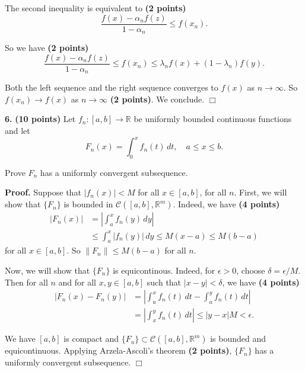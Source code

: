 \documentclass{article}
\begin{document}
The second inequality is equivalent to \textbf{(2 points)} \[
\frac{f(x) - \alpha_n f(z)}{1-\alpha_n} \le f(x_n).
\]

So we have \textbf{(2 points)} \[
\frac{f(x) - \alpha_n f(z)}{1-\alpha_n} \le f(x_n) \le \lambda_n f(x) + (1-\lambda_n)f(y).
\]

Both the left sequence and the right sequence converges to $f(x)$ as
$n \to\infty$. So $f(x_n) \to f(x)$ as $n\to \infty$ \textbf{(2
points)}. We conclude. $\Box$

    \textbf{6.} \textbf{(10 points)} Let $f_n:[a,b]\to \mathbb{R}$ be
uniformly bounded continuous functions and let
\[F_n(x) = \int_0^x f_n(t)\,dt,\quad a\le x \le b.\]

Prove $F_n$ has a uniformly convergent subsequence.

\textbf{Proof.} Suppose that $|f_n(x)| < M$ for all $x\in [a,b]$, for
all $n$. First, we will show that $\{F_n\}$ is bounded in
$\mathcal{C}([a,b],\mathbb{R}^m)$. Indeed, we have \textbf{(4 points)}
\[\begin{aligned}
|F_n(x)| &= \left| \int_a^x f_n(y) \,dy\right| \\
&\le \int_a^x |f_n(y)|\,dy \le M(x-a)\le M(b-a)
\end{aligned}\] for all $x\in [a,b]$. So $\|F_n\| \le M(b-a)$ for all
$n$.

Now, we will show that $\{F_n\}$ is equicontinous. Indeed, for
$\epsilon > 0$, choose $\delta= \epsilon / M$. Then for all $n$ and for
all $x,y\in [a,b]$ such that $|x-y| < \delta$, we have \textbf{(4
points)} \[\begin{aligned}
|F_n(x) - F_n(y)| &= \left| \int_a^x f_n(t)\, dt - \int_a^y f_n(t)\,dt\right|\\
&= \left|\int_x^y f_n(t)\,dt\right| \le |y-x|M < \epsilon.
\end{aligned}\]

We have $[a,b]$ is compact and
$\{F_n\} \subset \mathcal{C}([a,b] ,\mathbb{R}^m)$ is bounded and
equicontinuous. Applying Arzela-Ascoli's theorem \textbf{(2 points)},
$\{F_n\}$ has a uniformly convergent subsequence. $\Box$


    
    
    
    
\end{document}
